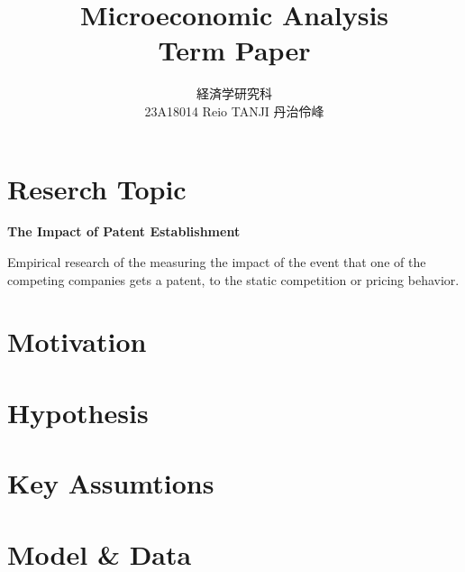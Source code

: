 \documentclass{jsarticle}[12pt]
\begin{document}
\title{Microeconomic Analysis \\
Term Paper}
\author{経済学研究科　 \\ 23A18014 Reio TANJI 丹治伶峰}
\date{}
\maketitle

\large

\section{Reserch Topic}

\Large

\textbf{The Impact of Patent Establishment}

\large

Empirical research of the measuring the impact of the event that one of the competing companies gets a patent, to the static competition or pricing behavior.

\section{Motivation}



\section{Hypothesis}



\section{Key Assumtions}



\section{Model \& Data}
\end{document}
